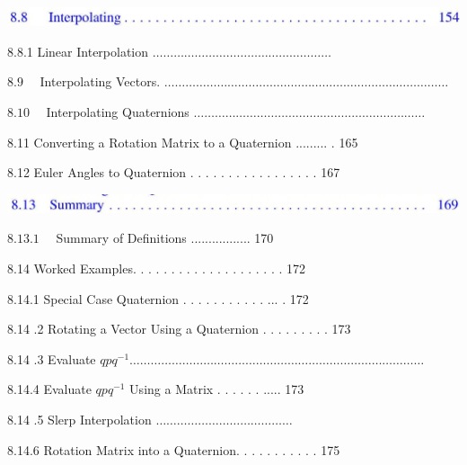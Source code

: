 \documentclass[10pt]{article}
\begin{document}
\begin{center}
\includegraphics[max width=\textwidth]{2023_04_20_41f1ceac5a31dc7d1b59g-013(3)}
\end{center}

8.8.1 Linear Interpolation $\ldots \ldots \ldots \ldots \ldots \ldots \ldots \ldots \ldots \ldots \ldots \ldots \ldots \ldots \ldots \ldots \ldots$

$8.9 \quad$ Interpolating Vectors. $\ldots \ldots \ldots \ldots \ldots \ldots \ldots \ldots \ldots \ldots \ldots \ldots \ldots \ldots \ldots \ldots \ldots \ldots \ldots \ldots \ldots \ldots \ldots \ldots \ldots \ldots \ldots$

$8.10 \quad$ Interpolating Quaternions $\ldots \ldots \ldots \ldots \ldots \ldots \ldots \ldots \ldots \ldots \ldots \ldots \ldots \ldots \ldots \ldots \ldots \ldots \ldots \ldots \ldots \ldots$

8.11 Converting a Rotation Matrix to a Quaternion ......... . 165

8.12 Euler Angles to Quaternion . . . . . . . . . . . . . . . . . 167

\begin{center}
\includegraphics[max width=\textwidth]{2023_04_20_41f1ceac5a31dc7d1b59g-013(9)}
\end{center}

$8.13 .1 \quad$ Summary of Definitions ................. 170

8.14 Worked Examples. . . . . . . . . . . . . . . . . . . . 172

8.14.1 Special Case Quaternion . . . . . . . . . . . ... . 172

8.14 .2 Rotating a Vector Using a Quaternion . . . . . . . . . 173

8.14 .3 Evaluate $q p q^{-1} \ldots \ldots \ldots \ldots \ldots \ldots \ldots \ldots \ldots \ldots \ldots \ldots \ldots \ldots \ldots \ldots \ldots \ldots \ldots \ldots \ldots \ldots \ldots \ldots \ldots \ldots \ldots \ldots$

8.14.4 Evaluate $q p q^{-1}$ Using a Matrix . . . . . . ..... 173

8.14 .5 Slerp Interpolation $\ldots \ldots \ldots \ldots \ldots \ldots \ldots \ldots \ldots \ldots \ldots \ldots \ldots$

8.14.6 Rotation Matrix into a Quaternion. . . . . . . . . . . 175
\end{document}
